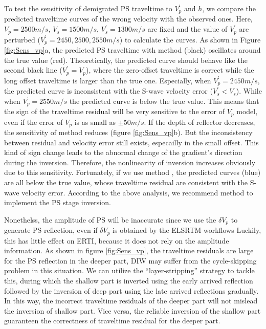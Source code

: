 To
test the sensitivity of demigrated PS traveltime to $V^{'}_p$ and $h$, we compare the predicted traveltime
curves of the wrong velocity with the observed ones.
Here, $V_p=2500m/s$, $V_s=1500m/s$, $V^{'}_s=1300m/s$ are fixed and the value of $V^{'}_p$
are perturbed ($V^{'}_p=2450, 2500, 2550m/s$) to calculate the curves.
As shown in Figure \ref{fig:Sens_vp}a, 
the predicted PS traveltime with method
 (black) oscillates around the true value (red). 
Theoretically, the predicted
curve should behave like the second black line ($V^{'}_p=V_p$), where the zero-offset traveltime is correct while
the long offset traveltime is larger than the true one. Especially, when $V^{'}_p=2450m/s$, the
predicted curve is inconsistent with the S-wave velocity error
($V^{'}_s<V_s$). While when $V^{'}_p=2550m/s$ the predicted curve is below the true value. 
This means that the sign of the traveltime residual will be very sensitive to the error of $V_p$ model,  
even if the error of $V_p$ is as small as $\pm50m/s$. 
If the depth of reflector decreases, the sensitivity of method  reduces (figure \ref{fig:Sens_vp}b). But the
inconsistency between residual and velocity error still exists, especailly in the small offset.
This kind of sign change leads to 
the abnormal change of the gradient's direction during the inversion. Therefore, the nonlinearity of
inversion increases obviously due to this sensitivity. Fortunately, if we use method  ,
the predicted curves (blue) are all below the true value, whose traveltime residual are consistent
with the S-wave velocity error.
According to the above analysis, we recommend method  to implement the PS stage inversion.

Nonethelss, the amplitude of PS will be inaccurate since we use the $\delta
V_p$ to generate PS reflection, even if $\delta V_p$ is obtained by the ELSRTM workflows
Luckily, this has little effect on ERTI, because it does not rely on the amplitude information.
As shown in figure \ref{fig:Sens_vp}, the traveltime residuals are 
large for the PS reflection in the deeper part, DIW may suffer from the cycle-skipping problem in this
situation. We can utilize the ``layer-stripping'' strategy to tackle this, during which the shallow part is
inverted using the early arrived reflection followed by the inversion of deep part using the late
arrived reflections gradually. In this way, the incorrect traveltime residuals of the deeper part will not
mislead the inversion of shallow part. Vice versa, the reliable inversion of the shallow part
guaranteen
the correctness of traveltime residual for the deeper part.

